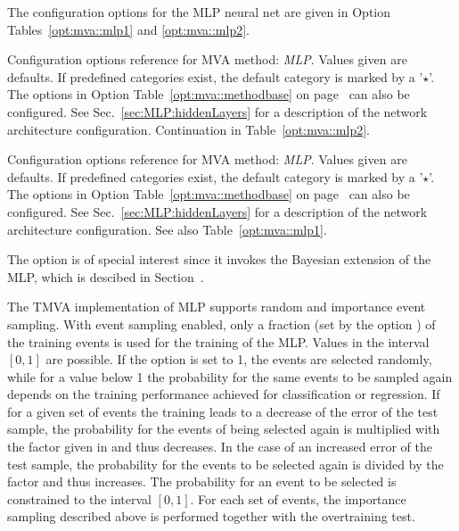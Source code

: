 The configuration options for the MLP neural net are given in Option 
Tables~\ref{opt:mva::mlp1} and \ref{opt:mva::mlp2}.
\begin{option}[p]

\caption[.]{\optionCaptionSize 
     Configuration options reference for MVA method: {\em MLP}.
     Values given are defaults. If predefined categories exist, the default category 
     is marked by a '$\star$'. The options in Option Table~\ref{opt:mva::methodbase} on 
     page~\pageref{opt:mva::methodbase} can also be configured.     
     See Sec.~\ref{sec:MLP:hiddenLayers} for a description of the 
     network architecture configuration. Continuation in Table~\ref{opt:mva::mlp2}.
}
\label{opt:mva::mlp1}
\end{option}
\begin{option}[t]

\caption[.]{\optionCaptionSize 
     Configuration options reference for MVA method: {\em MLP}.
     Values given are defaults. If predefined categories exist, the default category 
     is marked by a '$\star$'. The options in Option Table~\ref{opt:mva::methodbase} on 
     page~\pageref{opt:mva::methodbase} can also be configured.     
     See Sec.~\ref{sec:MLP:hiddenLayers} for a description of the 
     network architecture configuration. See also Table~\ref{opt:mva::mlp1}.
}
\label{opt:mva::mlp2}
\end{option}
The option  is of special interest since it invokes the Bayesian extension of the MLP, which is descibed in Section~\label{sec:ann:bayes}.

The TMVA implementation of MLP supports random and importance event sampling. With 
event sampling enabled, only a fraction (set by the option ) 
of the training events is used for the training of the MLP. Values in the interval 
$[0,1]$ are possible. If the  option  is set to 1, the 
events are selected randomly, while for a value below 1 the probability for the same 
events to be sampled again depends on the training performance achieved for 
classification or regression. If for a given set of events the training leads to a 
decrease of the error of the test sample, the probability for the events of being 
selected again is multiplied with the factor given in  
and thus decreases. In the case of an increased error of the test sample, the 
probability for the events to be selected again is divided by the factor 
 and thus increases. The probability for an event to 
be selected is constrained to the interval $[0,1]$. For each set of events, 
the importance sampling described above is performed together with the overtraining 
test.

